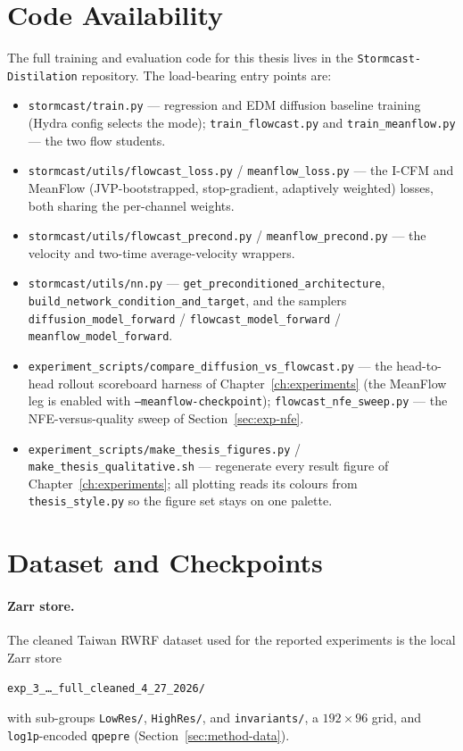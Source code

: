 
\label{app:repro}

\section{Code Availability}

The full training and evaluation code for this thesis lives in the \texttt{Stormcast-Distilation} repository. The load-bearing entry points are:
\begin{itemize}
  \item \texttt{stormcast/train.py} --- regression and EDM diffusion baseline training (Hydra config selects the mode); \texttt{train\_flowcast.py} and \texttt{train\_meanflow.py} --- the two flow students.
  \item \texttt{stormcast/utils/flowcast\_loss.py} / \texttt{meanflow\_loss.py} --- the I-CFM and MeanFlow (JVP-bootstrapped, stop-gradient, adaptively weighted) losses, both sharing the per-channel weights.
  \item \texttt{stormcast/utils/flowcast\_precond.py} / \texttt{meanflow\_precond.py} --- the velocity and two-time average-velocity wrappers.
  \item \texttt{stormcast/utils/nn.py} --- \texttt{get\_preconditioned\_architecture}, \texttt{build\_network\_condition\_and\_target}, and the samplers \texttt{diffusion\_model\_forward} / \texttt{flowcast\_model\_forward} / \texttt{meanflow\_model\_forward}.
  \item \texttt{experiment\_scripts/compare\_diffusion\_vs\_flowcast.py} --- the head-to-head rollout scoreboard harness of Chapter~\ref{ch:experiments} (the MeanFlow leg is enabled with \texttt{--meanflow-checkpoint}); \texttt{flowcast\_nfe\_sweep.py} --- the NFE-versus-quality sweep of Section~\ref{sec:exp-nfe}.
  \item \texttt{experiment\_scripts/make\_thesis\_figures.py} / \texttt{make\_thesis\_qualitative.sh} --- regenerate every result figure of Chapter~\ref{ch:experiments}; all plotting reads its colours from \texttt{thesis\_style.py} so the figure set stays on one palette.
\end{itemize}

\section{Dataset and Checkpoints}

\paragraph{Zarr store.} The cleaned Taiwan RWRF dataset used for the reported experiments is the local Zarr store
\begin{center}
\texttt{exp\_3\_\ldots\_full\_cleaned\_4\_27\_2026/}
\end{center}
with sub-groups \texttt{LowRes/}, \texttt{HighRes/}, and \texttt{invariants/}, a $192\times96$ grid, and \texttt{log1p}-encoded \texttt{qpepre} (Section~\ref{sec:method-data}).

